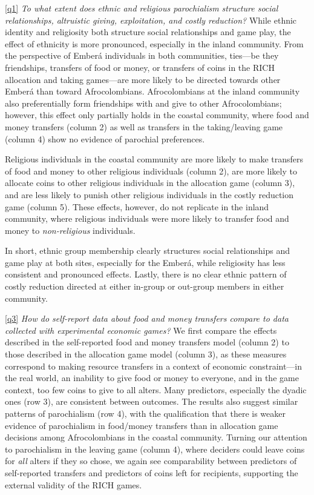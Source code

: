 \documentclass[bibauthoryear]{aa}
\begin{document}
\ref{q1} \emph{To what extent does ethnic and religious parochialism structure social relationships, altruistic giving, exploitation, and costly reduction?} While ethnic identity and religiosity both structure social relationships and game play, the effect of ethnicity is more pronounced, especially in the inland community. From the perspective of Ember\'a individuals in both communities, ties---be they friendships, transfers of food or money, or transfers of coins in the RICH allocation and taking games---are more likely to be directed towards other Ember\'a than toward Afrocolombians. Afrocolombians at the inland community also preferentially form friendships with and give to other Afrocolombians; however, this effect only partially holds in the coastal community, where food and money transfers (column 2) as well as transfers in the taking/leaving game (column 4) show no evidence of parochial preferences.

 Religious individuals in the coastal community are more likely to make transfers of food and money to other religious individuals (column 2), are more likely to allocate coins to other religious individuals in the allocation game (column 3), and are less likely to punish other religious individuals in the costly reduction game (column 5). These effects, however, do not replicate in the inland community, where religious individuals were more likely to transfer food and money to \textit{non-religious} individuals. 
 
 In short, ethnic group membership clearly structures social relationships and game play at both sites, especially for the Ember\'a, while religiosity has less consistent and pronounced effects. Lastly, there is no clear ethnic pattern of costly reduction directed at either in-group or out-group members in either community.


\ref{q3} \emph{How do self-report data about food and money transfers compare to data collected with experimental economic games?} We first compare the effects described in the self-reported food and money transfers model (column 2) to those described in the allocation game model (column 3), as these measures correspond to making resource transfers in a context of economic constraint---in the real world, an inability to give food or money to everyone, and in the game context, too few coins to give to all alters. Many predictors, especially the dyadic ones (row 3), are consistent between  outcomes. The results also suggest similar patterns of parochialism (row 4), with the qualification that there is weaker evidence of parochialism in food/money transfers than in allocation game decisions among Afrocolombians in the coastal community. Turning our attention to parochialism in the leaving game (column 4), where deciders could leave coins for \textit{all} alters if they so chose, we again see comparability between predictors of self-reported transfers and predictors of coins left for recipients, supporting the external validity of the RICH games.
\end{document}
